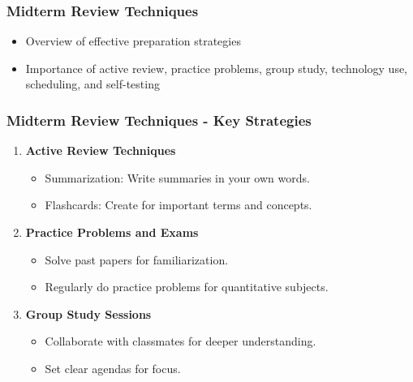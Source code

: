 \documentclass[aspectratio=169]{beamer}
\begin{document}
\begin{frame}[fragile]
    \frametitle{Midterm Review Techniques}
    \begin{itemize}
        \item Overview of effective preparation strategies
        \item Importance of active review, practice problems, group study, technology use, scheduling, and self-testing
    \end{itemize}
\end{frame}

\begin{frame}[fragile]
    \frametitle{Midterm Review Techniques - Key Strategies}
    \begin{enumerate}
        \item \textbf{Active Review Techniques}
            \begin{itemize}
                \item Summarization: Write summaries in your own words.
                \item Flashcards: Create for important terms and concepts.
            \end{itemize}

        \item \textbf{Practice Problems and Exams}
            \begin{itemize}
                \item Solve past papers for familiarization.
                \item Regularly do practice problems for quantitative subjects.
            \end{itemize}
        
        \item \textbf{Group Study Sessions}
            \begin{itemize}
                \item Collaborate with classmates for deeper understanding.
                \item Set clear agendas for focus.
            \end{itemize}
    \end{enumerate}
\end{frame}
\end{document}
